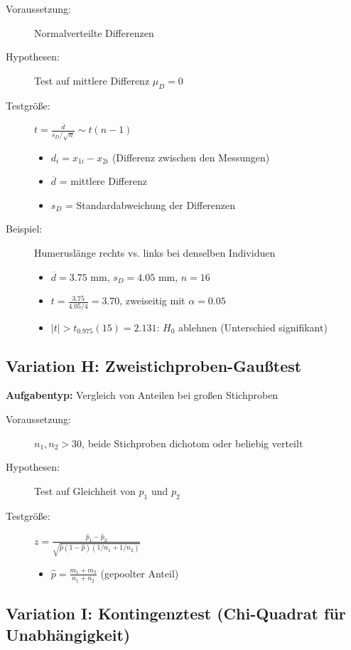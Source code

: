 \documentclass[12pt, a4paper, titlepage, ngerman]{scrartcl}
\begin{document}
\begin{description}
  \item[Voraussetzung:] Normalverteilte Differenzen
  \item[Hypothesen:] Test auf mittlere Differenz $\mu_D = 0$
  \item[Testgröße:] $t = \frac{\overline{d}}{s_D / \sqrt{n}} \sim t(n-1)$
    \begin{itemize}
      \item $d_i = x_{1i} - x_{2i}$ (Differenz zwischen den Messungen)
      \item $\overline{d}$ = mittlere Differenz
      \item $s_D$ = Standardabweichung der Differenzen
    \end{itemize}
  \item[Beispiel:] Humeruslänge rechts vs. links bei denselben Individuen
    \begin{itemize}
      \item $\overline{d} = 3.75$ mm, $s_D = 4.05$ mm, $n = 16$
      \item $t = \frac{3.75}{4.05/4} = 3.70$, zweiseitig mit $\alpha = 0.05$
      \item $|t| > t_{0.975}(15) = 2.131$: $H_0$ ablehnen (Unterschied signifikant)
    \end{itemize}
\end{description}

\subsection{Variation H: Zweistichproben-Gaußtest}

\textbf{Aufgabentyp:} Vergleich von Anteilen bei großen Stichproben

\begin{description}
  \item[Voraussetzung:] $n_1, n_2 > 30$, beide Stichproben dichotom oder beliebig verteilt
  \item[Hypothesen:] Test auf Gleichheit von $p_1$ und $p_2$
  \item[Testgröße:] $z = \frac{\hat{p}_1 - \hat{p}_2}{\sqrt{\hat{p}(1-\hat{p})(1/n_1 + 1/n_2)}}$
    \begin{itemize}
      \item $\hat{p} = \frac{m_1 + m_2}{n_1 + n_2}$ (gepoolter Anteil)
    \end{itemize}
\end{description}

\subsection{Variation I: Kontingenztest (Chi-Quadrat für Unabhängigkeit)}
\end{document}
